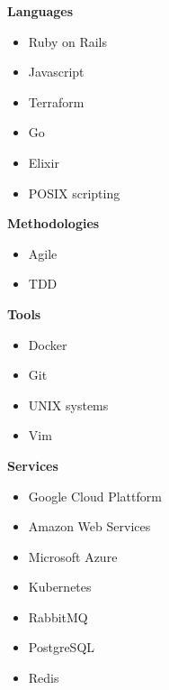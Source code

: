 \documentclass[9pt]{template} %
\begin{document}


\begin{minipage}[t]{0.3\textwidth} %
  \vspace{-\baselineskip}

  \textbf{Languages}
  \begin{itemize}
      \item Ruby on Rails
      \item Javascript
      \item Terraform
      \item Go
      \item Elixir
      \item POSIX scripting
  \end{itemize}
\end{minipage}
\hfill
\begin{minipage}[t]{0.3\textwidth}
  \vspace{-\baselineskip}

  \textbf{Methodologies}
  \begin{itemize}
      \item Agile
      \item TDD
  \end{itemize}

  \textbf{Tools}
  \begin{itemize}
      \item Docker
      \item Git
      \item UNIX systems
      \item Vim
  \end{itemize}
\end{minipage}
\hfill
\begin{minipage}[t]{0.3\textwidth}
  \vspace{-\baselineskip}

  \textbf{Services}
  \begin{itemize}
      \item Google Cloud Plattform
      \item Amazon Web Services
      \item Microsoft Azure
      \item Kubernetes
      \item RabbitMQ
      \item PostgreSQL
      \item Redis
  \end{itemize}
\end{minipage}

\end{document}
